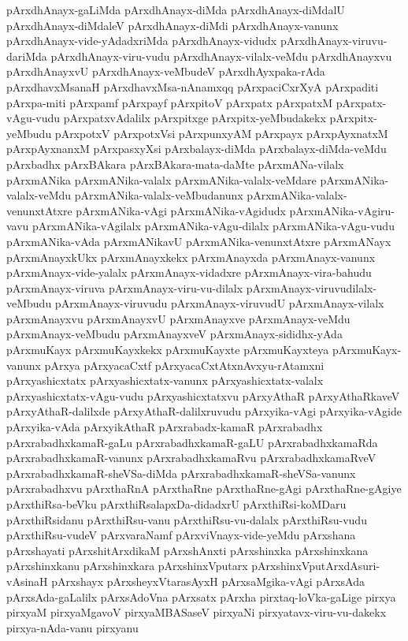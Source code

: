{pArxdhAnayx-gaLiMda
pArxdhAnayx-diMda
pArxdhAnayx-diMdalU
pArxdhAnayx-diMdaleV
pArxdhAnayx-diMdi
pArxdhAnayx-vanunx
pArxdhAnayx-vide-yAdadxriMda
pArxdhAnayx-vidudx
pArxdhAnayx-viruvu-dariMda
pArxdhAnayx-viru-vudu
pArxdhAnayx-vilalx-veMdu
pArxdhAnayxvu
pArxdhAnayxvU
pArxdhAnayx-veMbudeV
pArxdhAyxpaka-rAda
pArxdhavxMsanaH
pArxdhavxMsa-nAnamxqq
pArxpaciCxrXyA
pArxpaditi
pArxpa-miti
pArxpamf
pArxpayf
pArxpitoV
pArxpatx
pArxpatxM
pArxpatx-vAgu-vudu
pArxpatxvAdalilx
pArxpitxge
pArxpitx-yeMbudakekx
pArxpitx-yeMbudu
pArxpotxV
pArxpotxVsi
pArxpunxyAM
pArxpayx
pArxpAyxnatxM
pArxpAyxnanxM
pArxpasxyXsi
pArxbalayx-diMda
pArxbalayx-diMda-veMdu
pArxbadhx
pArxBAkara
pArxBAkara-mata-daMte
pArxmANa-vilalx
pArxmANika
pArxmANika-valalx
pArxmANika-valalx-veMdare
pArxmANika-valalx-veMdu
pArxmANika-valalx-veMbudanunx
pArxmANika-valalx-venunxtAtxre
pArxmANika-vAgi
pArxmANika-vAgidudx
pArxmANika-vAgiru-vavu
pArxmANika-vAgilalx
pArxmANika-vAgu-dilalx
pArxmANika-vAgu-vudu
pArxmANika-vAda
pArxmANikavU
pArxmANika-venunxtAtxre
pArxmANayx
pArxmAnayxkUkx
pArxmAnayxkekx
pArxmAnayxda
pArxmAnayx-vanunx
pArxmAnayx-vide-yalalx
pArxmAnayx-vidadxre
pArxmAnayx-vira-bahudu
pArxmAnayx-viruva
pArxmAnayx-viru-vu-dilalx
pArxmAnayx-viruvudilalx-veMbudu
pArxmAnayx-viruvudu
pArxmAnayx-viruvudU
pArxmAnayx-vilalx
pArxmAnayxvu
pArxmAnayxvU
pArxmAnayxve
pArxmAnayx-veMdu
pArxmAnayx-veMbudu
pArxmAnayxveV
pArxmAnayx-sididhx-yAda
pArxmuKayx
pArxmuKayxkekx
pArxmuKayxte
pArxmuKayxteya
pArxmuKayx-vanunx
pArxya
pArxyacaCxtf
pArxyacaCxtAtxnAvxyu-rAtamxni
pArxyashicxtatx
pArxyashicxtatx-vanunx
pArxyashicxtatx-valalx
pArxyashicxtatx-vAgu-vudu
pArxyashicxtatxvu
pArxyAthaR
pArxyAthaRkaveV
pArxyAthaR-dalilxde
pArxyAthaR-dalilxruvudu
pArxyika-vAgi
pArxyika-vAgide
pArxyika-vAda
pArxyikAthaR
pArxrabadx-kamaR
pArxrabadhx
pArxrabadhxkamaR-gaLu
pArxrabadhxkamaR-gaLU
pArxrabadhxkamaRda
pArxrabadhxkamaR-vanunx
pArxrabadhxkamaRvu
pArxrabadhxkamaRveV
pArxrabadhxkamaR-sheVSa-diMda
pArxrabadhxkamaR-sheVSa-vanunx
pArxrabadhxvu
pArxthaRnA
pArxthaRne
pArxthaRne-gAgi
pArxthaRne-gAgiye
pArxthiRsa-beVku
pArxthiRsalapxDa-didadxrU
pArxthiRsi-koMDaru
pArxthiRsidanu
pArxthiRsu-vanu
pArxthiRsu-vu-dalalx
pArxthiRsu-vudu
pArxthiRsu-vudeV
pArxvaraNamf
pArxviVnayx-vide-yeMdu
pArxshana
pArxshayati
pArxshitArxdikaM
pArxshAnxti
pArxshinxka
pArxshinxkana
pArxshinxkanu
pArxshinxkara
pArxshinxVputarx
pArxshinxVputArxdAsuri-vAsinaH
pArxshayx
pArxsheyxVtarasAyxH
pArxsaMgika-vAgi
pArxsAda
pArxsAda-gaLalilx
pArxsAdoVna
pArxsatx
pArxha
pirxtaq-loVka-gaLige
pirxya
pirxyaM
pirxyaMgavoV
pirxyaMBASaseV
pirxyaNi
pirxyatavx-viru-vu-dakekx
pirxya-nAda-vanu
pirxyanu
}
